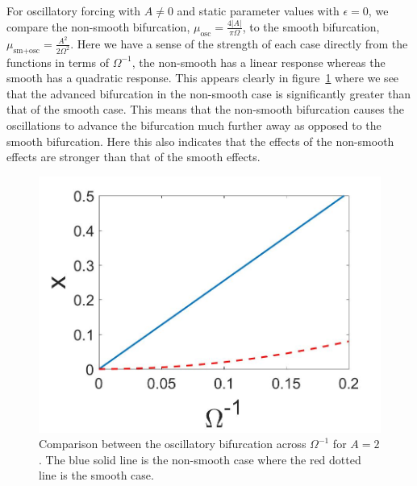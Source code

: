 \indent For oscillatory forcing with $A\not = 0$ and static parameter values with $\epsilon=0$, we compare the non-smooth bifurcation, $\mu_{\text{osc}} = \frac{4|A|}{\pi \Omega}$, to the smooth bifurcation, $\mu_{\text{sm+osc}}=\frac{A^2}{2\Omega^2}$. Here we have a sense of the strength of each case directly from the functions in terms of $\Omega^{-1}$, the non-smooth has a linear response whereas the smooth has a quadratic response. This appears clearly in figure~\ref{fig:osc_comp} where we see that the advanced bifurcation in the non-smooth case is significantly greater than that of the smooth case. This means that the non-smooth bifurcation causes the oscillations to advance the bifurcation much further away as opposed to the smooth bifurcation. Here this also indicates that the effects of the non-smooth effects are stronger than that of the smooth effects.

\begin{figure}[H]
\centering
\includegraphics[width=.7\linewidth]{conclusion/osccomp.jpg}
\caption{Comparison between the oscillatory bifurcation across $\Omega^{-1}$ for $A=2$. The blue solid line is the non-smooth case where the red dotted line is the smooth case.}
\label{fig:osc_comp}
\end{figure}

